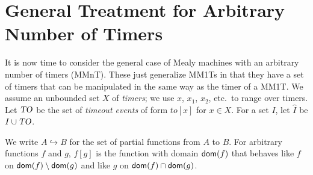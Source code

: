 \newcommand{\natplus}{\nat^{>0}}
\newcommand{\realsplus}{\bbbr^{\geq 0}}
\newcommand{\stoptimer}{\mathit{kill}}
\newcommand{\tosymbol}{\mathit{to}}
\newcommand{\toevent}[1]{\mathit{to}[#1]}
\newcommand{\toevents}{\mbox{\sl TO}}
\newcommand{\extinputs}{\hat{I}}
\newcommand{\acttimers}{\mathit{active}}
\newcommand{\expirable}{\mathit{expirable}}
\newcommand{\tvals}{\kappa}
\newcommand{\delay}[2]{t_{[#1:#2]}}
\newcommand{\timerof}[2]{x_{#1}^{#2}}
\newcommand{\constrof}[1]{\phi_{#1}}
\newcommand{\post}{\mathit{post}}
\newcommand{\beh}{\mathit{beh}}

\newcommand{\conc}{\cdot}
\newcommand{\tuple}[1]{\langle #1\rangle}
\newcommand{\set}[1]{\lbrace #1\rbrace}
\newcommand{\vect}[2]{{#1}_1 , \ldots , {#1}_{#2}}
\newcommand{\setcomp}[2]{\set{#1 ~:~ #2}}
\newcommand{\domof}[1]{\dom(#1)}
\newcommand{\ranof}[1]{\ran(#1)}
\newcommand{\vars}{\mathcal{X}}
\newcommand{\varsof}[1]{\vars(#1)}
\newcommand{\ctimers}{X}
\newcommand{\remap}{\pi}
\newcommand{\remapinst}{\rho}
\newcommand{\normalize}{\gamma}
\newcommand{\normalizeof}[2]{\normalize_{#2}^{#1}}
\newcommand{\timerbij}{\gamma}
\newcommand{\timerequiv}{\pi}
\newcommand{\extendedby}{\lhd}
\newcommand{\uttrace}{\textsf{tr}}
\newcommand{\uttraceof}[1]{\uttrace(#1)}
\newcommand{\uttracesof}[1]{\textsf{Tr}(#1)}
\newcommand{\strace}{\textsf{tr}_s}
\newcommand{\ssuffix}{v_s}
\newcommand{\suftraces}{\textsf{Tr}_s}
\newcommand{\pinpof}[1]{\textit{inp}_p(#1)}
\newcommand{\sinpof}[1]{\textit{inp}_s(#1)}
\newcommand{\symbinpof}[1]{\textit{symbinp}(#1)}
\newcommand{\word}{w}
\newcommand{\smap}{{\cal O}}
\newcommand{\smappre}{{\cal O_p}}
\newcommand{\smapsuf}{{\cal O_s}}
\newcommand{\obspre}{{\cal O_U}}

\section{General Treatment for Arbitrary Number of Timers}

It is now time to consider the general case of
Mealy machines with an arbitrary number of timers (MMnT). 
These just generalize MM1Ts in that they have a set of timers that
can be manipulated in the same way as the timer of a MM1T.
We assume an unbounded set $X$ of {\em timers};
we use $x$, $x_1$, $x_2$, etc.\ to range over timers.
Let $\toevents$ be the set of {\em timeout events} of form
$\toevent{x}$ for $x \in X$.
For a set $I$, let $\extinputs$ be $I \cup \toevents$.

We write $A \hookrightarrow B$ for the set of partial functions from $A$ to $B$.
For arbitrary functions $f$ and $g$, $f [g]$ is the function with domain $\domof{f}$ that behaves like $f$
on $\domof{f} \setminus \domof{g}$ and like $g$ on $\domof{f} \cap \domof{g}$.

